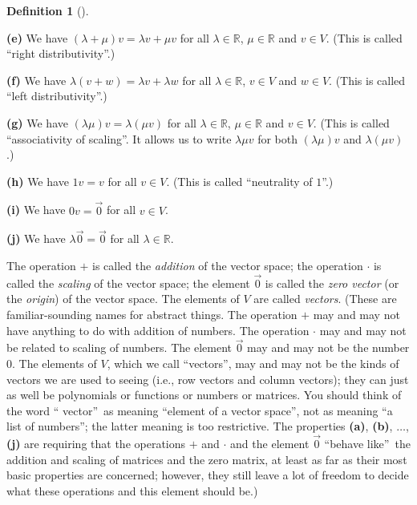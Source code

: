 \documentclass[numbers=enddot,12pt,final,onecolumn,notitlepage]{scrartcl}%
\theoremstyle{definition}
\newtheorem{defi}[theo]{Definition}
\newenvironment{definition}[1][]
{\begin{defi}[#1]\begin{leftbar}}
{\end{leftbar}\end{defi}}
\begin{document}
\begin{definition}
\textbf{(e)} We have $\left(  \lambda+\mu\right)  v=\lambda v+\mu v$ for all
$\lambda\in\mathbb{R}$, $\mu\in\mathbb{R}$ and $v\in V$. (This is called
\textquotedblleft right distributivity\textquotedblright.)

\textbf{(f)} We have $\lambda\left(  v+w\right)  =\lambda v+\lambda w$ for all
$\lambda\in\mathbb{R}$, $v\in V$ and $w\in V$. (This is called
\textquotedblleft left distributivity\textquotedblright.)

\textbf{(g)} We have $\left(  \lambda\mu\right)  v=\lambda\left(  \mu
v\right)  $ for all $\lambda\in\mathbb{R}$, $\mu\in\mathbb{R}$ and $v\in V$.
(This is called \textquotedblleft associativity of scaling\textquotedblright.
It allows us to write $\lambda\mu v$ for both $\left(  \lambda\mu\right)  v$
and $\lambda\left(  \mu v\right)  $.)

\textbf{(h)} We have $1v=v$ for all $v\in V$. (This is called
\textquotedblleft neutrality of $1$\textquotedblright.)

\textbf{(i)} We have $0v=\overrightarrow{0}$ for all $v\in V$.

\textbf{(j)} We have $\lambda\overrightarrow{0}=\overrightarrow{0}$ for all
$\lambda\in\mathbb{R}$.

The operation $+$ is called the \textit{addition} of the vector space; the
operation $\cdot$ is called the \textit{scaling} of the vector space; the
element $\overrightarrow{0}$ is called the \textit{zero vector} (or the
\textit{origin}) of the vector space. The elements of $V$ are called
\textit{vectors}. (These are familiar-sounding names for abstract things. The
operation $+$ may and may not have anything to do with addition of numbers.
The operation $\cdot$ may and may not be related to scaling of numbers. The
element $\overrightarrow{0}$ may and may not be the number $0$. The elements
of $V$, which we call \textquotedblleft vectors\textquotedblright, may and may
not be the kinds of vectors we are used to seeing (i.e., row vectors and
column vectors); they can just as well be polynomials or functions or numbers
or matrices. You should think of the word \textquotedblleft
vector\textquotedblright\ as meaning \textquotedblleft element of a vector
space\textquotedblright, not as meaning \textquotedblleft a list of
numbers\textquotedblright; the latter meaning is too restrictive. The
properties \textbf{(a)}, \textbf{(b)}, $\ldots$, \textbf{(j)} are requiring
that the operations $+$ and $\cdot$ and the element $\overrightarrow{0}$
\textquotedblleft behave like\textquotedblright\ the addition and scaling of
matrices and the zero matrix, at least as far as their most basic properties
are concerned; however, they still leave a lot of freedom to decide what these
operations and this element should be.)


\end{definition}
\end{document}
